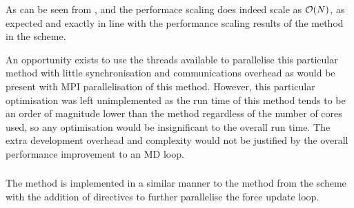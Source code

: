 \begin{figure}[!h]
    
    \caption{}
    \label{fig:v1_shared_and_replicated_individual_operation_32768_time}
\end  {figure}

\vOneSRTimeExplanation
    {}
    {}
    {}
    {\individualoperation{}}
    {\replicateddata{}}


%
As can be seen from 
,
 and
the performace scaling does indeed scale as $\mathcal{O}{\left({ N }\right)}$, as expected
and exactly in line with the performance scaling results of the
\individualoperation{} method in the \replicateddata{} scheme.

An opportunity exists to use the \openmp{} threads available to
parallelise this particular method with little synchronisation
and communications overhead as would be present with MPI
parallelisation of this method.
%
However, this particular optimisation was left unimplemented as
the run time of this method tends to be an order of magnitude
lower than the \pairoperation{} method regardless of the
number of cores used, so any optimisation
would be insignificant to the overall run time.
%
The extra development overhead and complexity would not be justified by the
overall performance improvement to an MD loop.



\subsubsection{\pairoperation{}}

The \pairoperation{} method is implemented in a similar manner to the
\pairoperation{} method from the \replicateddata{} scheme with the
addition of \openmp{} directives to further parallelise the
force update loop.

%

%
%
\begin{figure}[!h]
    
    \caption{
        \vZeroSpeedupCaption
            {\sharedandreplicateddata{}}
            {\pairoperation{}}
    }
    \label{fig:v1_shared_and_replicated_data_pair_operation_speedups}
\end{figure}


